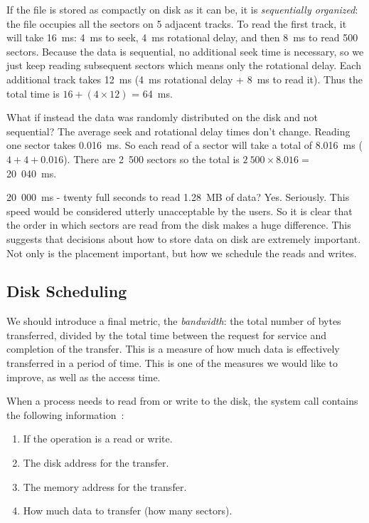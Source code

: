 If the file is stored as compactly on disk as it can be, it is \textit{sequentially organized}: the file occupies all the sectors on 5 adjacent tracks. To read the first track, it will take 16~ms: 4~ms to seek, 4~ms rotational delay, and then 8~ms to read 500 sectors. Because the data is sequential, no additional seek time is necessary, so we just keep reading subsequent sectors which means only the rotational delay. Each additional track takes 12~ms (4~ms rotational delay + 8~ms to read it). Thus the total time is $16 + (4 \times 12)$ = 64~ms.

What if instead the data was randomly distributed on the disk and not sequential? The average seek and rotational delay times don't change. Reading one sector takes 0.016~ms. So each read of a sector will take a total of 8.016~ms ($4 + 4 + 0.016$). There are 2~500 sectors so the total is $2~500 \times 8.016 =$ 20~040~ms. 

20~000~ms - twenty full seconds to read 1.28~MB of data? Yes. Seriously. This speed would be considered utterly unacceptable by the users. So it is clear that the order in which sectors are read from the disk makes a huge difference. This suggests that decisions about how to store data on disk are extremely important. Not only is the placement important, but how we schedule the reads and writes.

\subsection*{Disk Scheduling}
We should introduce a final metric, the \textit{bandwidth}: the total number of bytes transferred, divided by the total time between the request for service and completion of the transfer. This is a measure of how much data is effectively transferred in a period of time. This is one of the measures we would like to improve, as well as the access time.

When a process needs to read from or write to the disk, the system call contains the following information~\cite{osc}:

\begin{enumerate}
	\item If the operation is a read or write.
	\item The disk address for the transfer.
	\item The memory address for the transfer.
	\item How much data to transfer (how many sectors).
\end{enumerate}

